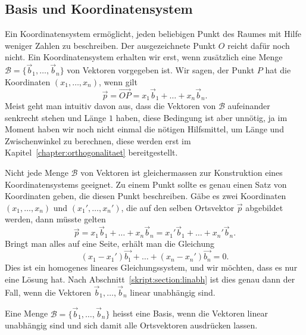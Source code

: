 %
%
\subsection{Basis und Koordinatensystem}
Ein Koordinatensystem ermöglicht, jeden beliebigen Punkt des Raumes mit
Hilfe weniger Zahlen zu beschreiben.
Der ausgezeichnete Punkt $O$ reicht dafür noch nicht. 
Ein Koordinatensystem erhalten wir erst, wenn zusätzlich eine Menge
$\mathcal{B}=\{\vec{b}_1,\dots,\vec{b}_n\}$ von Vektoren vorgegeben ist.
Wir sagen, der Punkt $P$ hat die Koordinaten $(x_1,\dots,x_n)$, wenn 
gilt
\[
\vec{p}=\overrightarrow{OP} = x_1\vec{b}_1+\dots+x_n\vec{b}_n.
\]
Meist geht man intuitiv davon aus, dass die Vektoren von $\mathcal{B}$
aufeinander senkrecht stehen und Länge $1$ haben, diese Bedingung
ist aber unnötig, ja im Moment haben wir noch nicht einmal die
nötigen Hilfsmittel, um Länge und Zwischenwinkel zu berechnen, diese
werden erst im Kapitel~\ref{chapter:orthogonalitaet} bereitgestellt.

Nicht jede Menge $\mathcal{B}$ von Vektoren ist gleichermassen
zur Konstruktion eines Koordinatensystems geeignet.
Zu einem Punkt sollte es genau einen Satz von Koordinaten geben,
die diesen Punkt beschreiben.
Gäbe es zwei Koordinaten $(x_1,\dots,x_n)$ und $(x_1',\dots,x_n')$,
die auf den selben Ortsvektor $\vec{p}$ abgebildet werden, dann müsste gelten
\[
\vec{p}=
x_1\vec{b}_1+\dots+x_n\vec{b}_n
=
x_1'\vec{b}_1+\dots+x_n'\vec{b}_n.
\]
Bringt man alles auf eine Seite, erhält man die Gleichung
\[
(x_1-x_1')\vec{b_1}
+\dots+
(x_n-x_n')\vec{b_n}
=0.
\]
Dies ist ein homogenes lineares Gleichungssystem, und wir möchten, dass
es nur eine Lösung hat.
Nach Abschnitt~\ref{skript:section:linabh} ist dies genau dann der Fall,
wenn die Vektoren $\vec{b}_1,\dots,\vec{b}_n$ linear unabhängig sind.

\begin{definition}
Eine Menge $\mathcal{B}=\{\vec{b}_1,\dots,\vec{b}_n\}$ heisst eine Basis,
wenn die Vektoren linear unabhängig sind und sich damit alle Ortsvektoren
ausdrücken lassen.
\end{definition}

